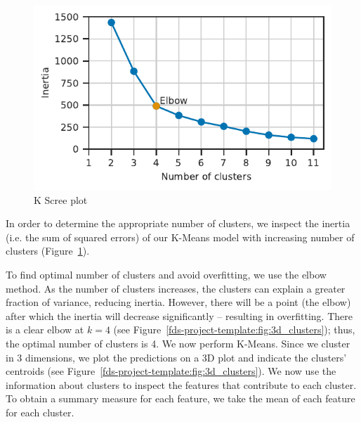 \documentclass[11pt,a4paper]{article}
\begin{document}
\begin{figure} [h!]
  \centering
  \includegraphics{report/k_screeplot.pdf}
  \caption{K Scree plot}
  \label{fds-project-template:fig:k_screeplot}
\end{figure}
In order to determine the appropriate number of clusters, we inspect the inertia (i.e. the sum of squared errors) of our K-Means model with increasing number of clusters (Figure~\ref{fds-project-template:fig:k_screeplot}). 

To find optimal number of clusters and avoid overfitting, we use the elbow method. As the number of clusters increases, the clusters can explain a greater fraction of variance, reducing inertia. However, there will be a point (the elbow) after which the inertia will decrease significantly \cite{wiki:elbow} – resulting in overfitting. There is a clear elbow at $k = 4$ (see Figure~\ref{fds-project-template:fig:3d_clusters}); thus, the optimal number of clusters is 4. We now perform K-Means. Since we cluster in 3 dimensions, we plot the predictions on a 3D plot and indicate the clusters' centroids (see Figure~\ref{fds-project-template:fig:3d_clusters}). We now use the information about clusters to inspect the features that contribute to each cluster. To obtain a summary measure for each feature, we take the mean of each feature for each cluster.
\end{document}
